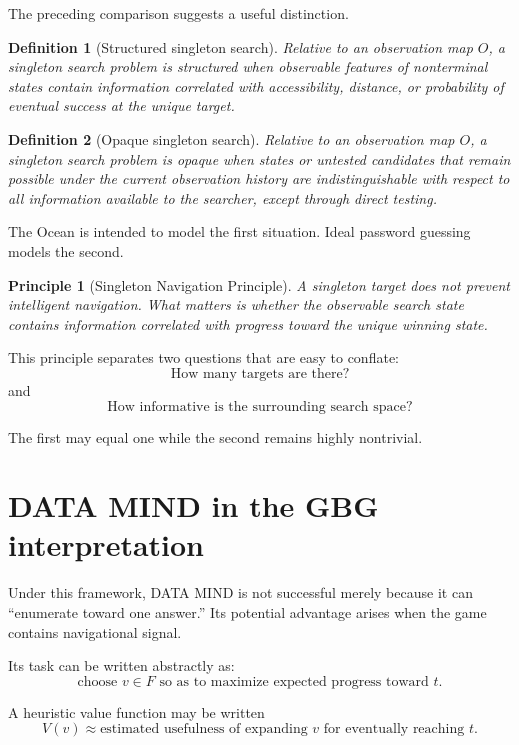 \documentclass[11pt]{article}
\newtheorem{definition}{Definition}
\newtheorem{principle}{Principle}
\begin{document}
The preceding comparison suggests a useful distinction.

\begin{definition}[Structured singleton search]
Relative to an observation map \(O\), a singleton search problem is
\emph{structured} when observable features of nonterminal states contain
information correlated with accessibility, distance, or probability of
eventual success at the unique target.
\end{definition}

\begin{definition}[Opaque singleton search]
Relative to an observation map \(O\), a singleton search problem is
\emph{opaque} when states or untested candidates that remain possible under the
current observation history are indistinguishable with respect to all
information available to the searcher, except through direct testing.
\end{definition}

The Ocean is intended to model the first situation. Ideal password guessing
models the second.

\begin{principle}[Singleton Navigation Principle]
A singleton target does not prevent intelligent navigation. What matters is
whether the observable search state contains information correlated with
progress toward the unique winning state.
\end{principle}

This principle separates two questions that are easy to conflate:
\[
\text{How many targets are there?}
\]
and
\[
\text{How informative is the surrounding search space?}
\]

The first may equal one while the second remains highly nontrivial.

\section{DATA MIND in the GBG interpretation}

Under this framework, DATA MIND is not successful merely because it can
``enumerate toward one answer.'' Its potential advantage arises when the game
contains navigational signal.

Its task can be written abstractly as:
\[
\text{choose }v\in F
\text{ so as to maximize expected progress toward }t.
\]

A heuristic value function may be written
\[
V(v)\approx
\text{estimated usefulness of expanding }v
\text{ for eventually reaching }t.
\]
\end{document}
